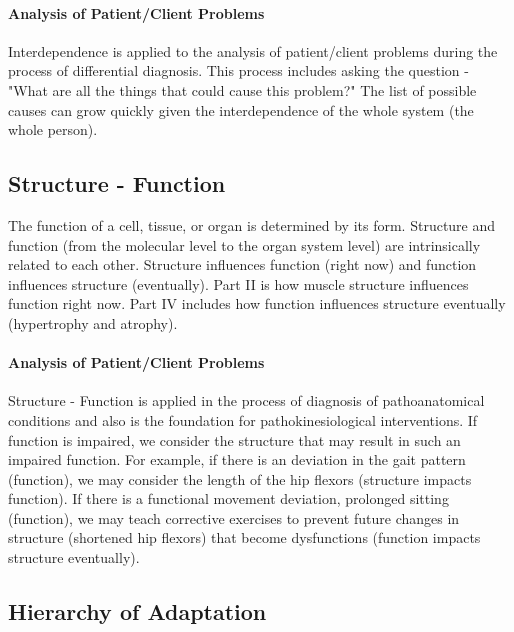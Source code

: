 \paragraph{Analysis of Patient/Client Problems}
Interdependence is applied to the analysis of patient/client problems during the process of differential diagnosis. This process includes asking the question - "What are all the things that could cause this problem?" The list of possible causes can grow quickly given the interdependence of the whole system (the whole person).

\subsection{Structure - Function}
The function of a cell, tissue, or organ is determined by its form. Structure and function (from the molecular level to the organ system level) are intrinsically related to each other. Structure influences function (right now) and function influences structure (eventually). Part II is how muscle structure influences function right now. Part IV includes how function influences structure eventually (hypertrophy and atrophy).

\paragraph{Analysis of Patient/Client Problems}
Structure - Function is applied in the process of diagnosis of pathoanatomical conditions and also is the foundation for pathokinesiological interventions. If function is impaired, we consider the structure that may result in such an impaired function. For example, if there is an deviation in the gait pattern (function), we may consider the length of the hip flexors (structure impacts function). If there is a functional movement deviation, prolonged sitting (function), we may teach corrective exercises to prevent future changes in structure (shortened hip flexors) that become dysfunctions (function impacts structure eventually).

\subsection{Hierarchy of Adaptation}

